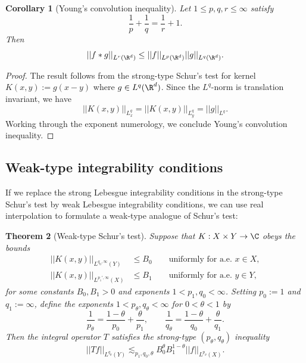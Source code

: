 \documentclass[reqno]{amsart}
\newtheorem{theorem}{Theorem}
\newtheorem{corollary}[theorem]{Corollary}
\theoremstyle{definition}
\theoremstyle{remark}
\begin{document}
\begin{corollary}[Young's convolution inequality]
	Let $1 \leq p, q, r \leq \infty$ satisfy
		\[ \frac1p + \frac1q = \frac1r + 1. \]
	Then 
		\[ ||f * g||_{L^r (\R^d)} \leq ||f||_{L^p (\R^d)} ||g||_{L^q (\R^d)}. \]	
\end{corollary}

\begin{proof}
	The result follows from the strong-type Schur's test for kernel $K(x, y) := g(x - y)$ where $g \in L^q (\R^d)$. Since the $L^q$-norm is translation invariant, we have
		\[ ||K(x, y)||_{L^q_x} =  ||K(x, y)||_{L^q_y} = ||g||_{L^q}.  \]
	Working through the exponent numerology, we conclude Young's convolution inequality. 	
\end{proof}

\subsection{Weak-type integrability conditions}

If we replace the strong Lebesgue integrability conditions in the strong-type Schur's test by weak Lebesgue integrability conditions, we can use real interpolation to formulate a weak-type analogue of Schur's test:

\begin{theorem}[Weak-type Schur's test]
	Suppose that $K : X \times Y \to \C$ obeys the bounds
		\begin{align*}
			|| K(x, y) ||_{L^{q_0, \infty} (Y)} &\leq B_0 \qquad \text{uniformly for a.e. $x \in X$},\\
			 || K(x, y) ||_{L^{p_1', \infty} (X)} &\leq B_1 \qquad \text{uniformly for a.e. $y \in Y$},
		\end{align*}	
	for some constants $B_0, B_1 > 0$ and exponents $1 < p_1, q_0 < \infty$. Setting $p_0 := 1$ and $q_1 := \infty$, define the exponents $1 < p_\theta, q_\theta < \infty$ for $0 < \theta < 1$ by 
		\[ \frac{1}{p_\theta} = \frac{1 - \theta}{p_0} + \frac{\theta}{p_1}, \qquad \frac{1}{q_\theta} = \frac{1 - \theta}{q_0} + \frac{\theta}{q_1}. \]
	Then the integral operator $T$ satisfies the strong-type $(p_\theta, q_\theta)$ inequality
		\[ ||Tf||_{L^{q_\theta} (Y)} \lesssim_{p_1, q_0, \theta} B_0^\theta B_1^{1 - \theta} ||f||_{L^{p_\theta} (X)}. \] 
\end{theorem}
\end{document}
